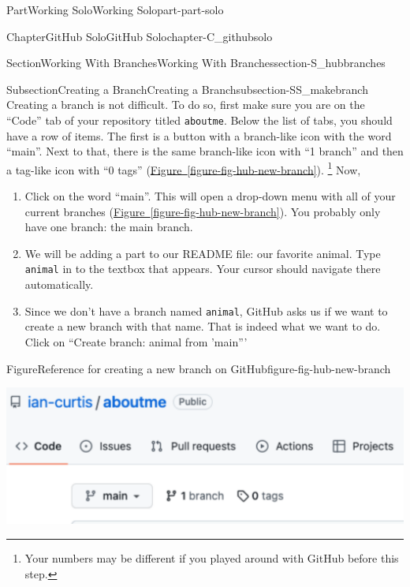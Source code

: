 \documentclass[oneside,10pt,]{book}
\newcommand{\xreffont}{\relax}
\newcommand{\mono}[1]{\texttt{#1}}
\begin{document}
\begin{partptx}{Part}{Working Solo}{}{Working Solo}{}{}{part-part-solo}
\begin{chapterptx}{Chapter}{GitHub Solo}{}{GitHub Solo}{}{}{chapter-C_githubsolo}
\begin{sectionptx}{Section}{Working With Branches}{}{Working With Branches}{}{}{section-S_hubbranches}
\begin{subsectionptx}{Subsection}{Creating a Branch}{}{Creating a Branch}{}{}{subsection-SS_makebranch}
%
%
Creating a branch is not difficult. To do so, first make sure you are on the ``Code'' tab of your repository titled \mono{aboutme}. Below the list of tabs, you should have a row of items. The first is a button with a branch-like icon with the word ``main''. Next to that, there is the same branch-like icon with ``1 branch'' and then a tag-like icon with ``0 tags'' (\hyperref[figure-fig-hub-new-branch]{Figure~{\xreffont\ref{figure-fig-hub-new-branch}}}). \footnote{Your numbers may be different if you played around with GitHub before this step.\label{fn-SS_makebranch-d-g}} Now,%
\begin{enumerate}
\item{}Click on the word ``main''. This will open a drop-down menu with all of your current branches (\hyperref[figure-fig-hub-new-branch]{Figure~{\xreffont\ref{figure-fig-hub-new-branch}}}). You probably only have one branch: the main branch.%
\item{}We will be adding a part to our README file: our favorite animal. Type \mono{animal} in to the textbox that appears. Your cursor should navigate there automatically.%
\item{}Since we don't have a branch named \mono{animal}, GitHub asks us if we want to create a new branch with that name. That is indeed what we want to do. Click on ``Create branch: animal from 'main'''%
\end{enumerate}
%
\begin{figureptx}{Figure}{Reference for creating a new branch on GitHub}{figure-fig-hub-new-branch}{}%
\begin{sidebyside}{2}{0}{0}{0}%
\begin{sbspanel}{0.5}%
\includegraphics[width=\linewidth]{external/hub_new_branch.pdf}
\end{sbspanel}%
\begin{sbspanel}{0.5}%

\end{sbspanel}
\end{sidebyside}
\end{figureptx}
\end{subsectionptx}
\end{sectionptx}
\end{chapterptx}
\end{partptx}
\end{document}

